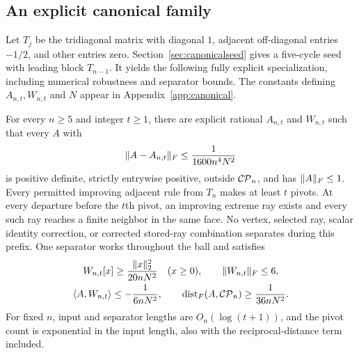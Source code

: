 \subsection{An explicit canonical family}
Let $T_j$ be the tridiagonal matrix with diagonal $1$, adjacent off-diagonal entries $-1/2$, and other entries zero. Section~\ref{sec:canonicalseed} gives a five-cycle seed with leading block $T_{n-1}$. It yields the following fully explicit specialization, including numerical robustness and separator bounds. The constants defining $A_{n,t},W_{n,t}$ and $N$ appear in Appendix~\ref{app:canonical}.

\begin{corollary}\label{cor:canonical}
For every $n\ge5$ and integer $t\ge1$, there are explicit rational $A_{n,t}$ and $W_{n,t}$ such that every $A$ with
\[
 \lVert A-A_{n,t}\rVert_F\le\frac1{1600n^4N^2}
\]
is positive definite, strictly entrywise positive, outside $\mathcal{CP}_n$, and has $\lVert A\rVert_F\le1$. Every permitted improving adjacent rule from $T_n$ makes at least $t$ pivots. At every departure before the $t$th pivot, an improving extreme ray exists and every such ray reaches a finite neighbor in the same face. No vertex, selected ray, scalar identity correction, or corrected stored-ray combination separates during this prefix. One separator works throughout the ball and satisfies
\begin{gather}\label{eq:canonicalmargins}
 W_{n,t}[x]\ge\frac{\lVert x\rVert_2^2}{20nN^2}\quad(x\ge0),\qquad
 \lVert W_{n,t}\rVert_F\le6,\\
 \langle A,W_{n,t}\rangle\le-\frac1{6nN^2},\qquad
 \operatorname{dist}_F(A,\mathcal{CP}_n)\ge\frac1{36nN^2}.
\end{gather}
For fixed $n$, input and separator lengths are $O_n(\log(t+1))$, and the pivot count is exponential in the input length, also with the reciprocal-distance term included.
\end{corollary}
